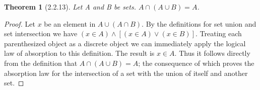 \documentclass[a4paper, 12pt]{article}
\theoremstyle{plain}
\newtheorem*{theorem*}{Theorem}
\begin{document}
	
	\begin{theorem*}[2.2.13]
		Let A and B be sets. $A \cap (A \cup B) = A$.
	\end{theorem*}
	
	\begin{proof}
		Let $x$ be an element in $A \cup (A \cap B)$. By the definitions for set union and set intersection we have $(x \in A) \land [(x \in A) \lor (x \in B)]$. Treating each parenthesized object as a discrete object we can immediately apply the logical law of absorption to this definition. The result is $x \in A$. Thus it follows directly from the definition that $A \cap (A \cup B) = A$; the consequence of which proves the absorption law for the intersection of a set with the union of itself and another set.
	\end{proof}
\end{document}
